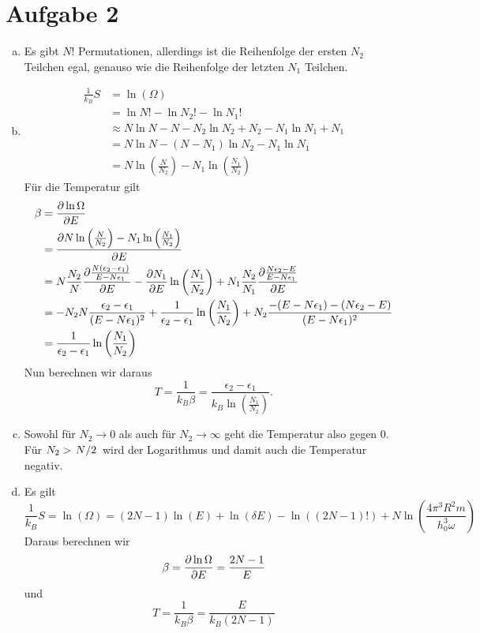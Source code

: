 \documentclass{article}
\theoremstyle{definition}
\begin{document}
\section*{Aufgabe 2}
\begin{enumerate}[(a)]
	\item Es gibt $N!$ Permutationen, allerdings ist die Reihenfolge der ersten $N_2$ Teilchen egal, genauso wie die Reihenfolge der letzten $N_1$ Teilchen.
	\item \begin{align*}
		\frac{1}{k_B}S &= \ln(\Omega)\\
		&= \ln N! - \ln N_2! - \ln N_1 !\\
		&\approx N\ln N - N - N_2\ln N_2 + N_2 - N_1\ln N_1 + N_1\\
		&= N\ln N - (N- N_1) \ln N_2 - N_1\ln N_1\\
		&= N\ln\left(\frac{N}{N_2}\right) - N_1\ln\left(\frac{N_1}{N_2}\right)
	\end{align*}
	Für die Temperatur gilt
	\begin{align*}
		\beta &= \pdv{\ln \Omega}{E}\\
		&= \pdv{N\ln\left(\frac{N}{N_2}\right) - N_1\ln\left(\frac{N_1}{N_2}\right)}{E}\\
		&= N \frac{N_2}{N} \pdv{\frac{N(\epsilon_2-\epsilon_1)}{E-N\epsilon_1}}{E}- \pdv{N_1}{E}\ln\left(\frac{N_1}{N_2}\right) + N_1\frac{N_2}{N_1}\pdv{\frac{N\epsilon_2-E}{E-N\epsilon_1}}{E}\\
		&= -N_2N\frac{\epsilon_2-\epsilon_1}{(E-N\epsilon_1)^2} +\frac{1}{\epsilon_2-\epsilon_1}\ln\left(\frac{N_1}{N_2}\right) + N_2 \frac{-(E - N\epsilon_1) - (N\epsilon_2 - E)}{(E-N\epsilon_1)^2}\\
		&= \frac{1}{\epsilon_2-\epsilon_1}\ln\left(\frac{N_1}{N_2}\right)
	\end{align*}
	Nun berechnen wir daraus \[T = \frac{1}{k_B \beta} = \frac{\epsilon_2-\epsilon_1}{k_B\ln\left(\frac{N_1}{N_2}\right)}.\] 
	\item Sowohl für $N_2 \to 0$ als auch für $N_2 \to \infty$ geht die Temperatur also gegen 0. Für $N_2 > \flatfrac{N}{2}$ wird der Logarithmus und damit auch die Temperatur negativ.
	\item Es gilt
	\[
		\frac{1}{k_B} S = \ln(\Omega) = (2N-1)\ln(E) + \ln(\delta E) - \ln((2N-1)!) + N\ln\left(\frac{4\pi^3R^2m}{h_0^3\omega}\right)
	\]
	Daraus berechnen wir
	\[
		\beta = \pdv{\ln\Omega}{E}= \frac{2N-1}{E}
	\] und 
	\[
		T = \frac{1}{k_B\beta} = \frac{E}{k_B(2N-1)}	
	\]
\end{enumerate}
\end{document}
